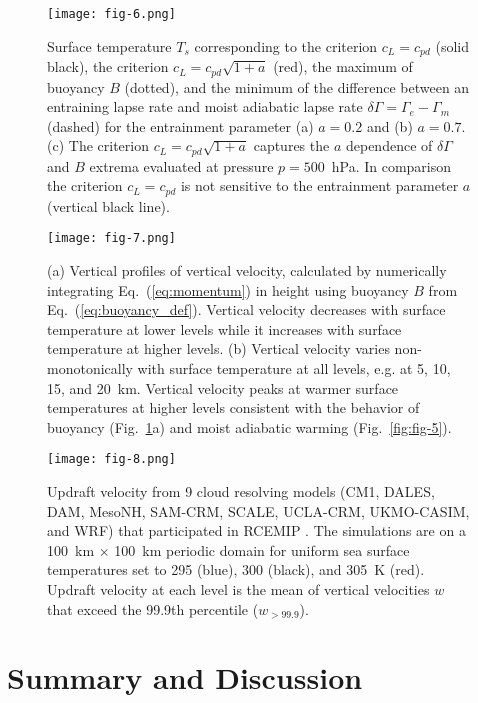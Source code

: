 \documentclass[draft]{ametsocV6.1}
\begin{document}
\begin{figure}[htbp]
 \centering
 \texttt{[image: fig-6.png]}\\
 \caption{Surface temperature $T_s$ corresponding to the criterion $c_L=c_{pd}$ (solid black), the criterion $c_L=c_{pd}\sqrt{1+a}$ (red), the maximum of buoyancy $B$ (dotted), and the minimum of the difference between an entraining lapse rate and moist adiabatic lapse rate $\delta \Gamma = \Gamma_e - \Gamma_m$ (dashed) for the entrainment parameter (a) $a=0.2$ and (b) $a=0.7$. (c) The criterion $c_L=c_{pd}\sqrt{1+a}$ captures the $a$ dependence of $\delta \Gamma$ and $B$ extrema evaluated at pressure $p=500$~hPa. In comparison the criterion $c_L=c_{pd}$ is not sensitive to the entrainment parameter $a$ (vertical black line).}\label{fig:fig-6}
\end{figure}

\begin{figure}[htbp]
 \centering
 \texttt{[image: fig-7.png]}\\
 \caption{(a) Vertical profiles of vertical velocity, calculated by numerically integrating Eq.~(\ref{eq:momentum}) in height using buoyancy $B$ from Eq.~(\ref{eq:buoyancy_def}). Vertical velocity decreases with surface temperature at lower levels while it increases with surface temperature at higher levels. (b) Vertical velocity varies non-monotonically with surface temperature at all levels, e.g. at 5, 10, 15, and 20~km. Vertical velocity peaks at warmer surface temperatures at higher levels consistent with the behavior of buoyancy (Fig.~\ref{fig:fig-6}a) and moist adiabatic warming (Fig.~\ref{fig:fig-5}).}\label{fig:fig-7}
\end{figure}

\clearpage

\begin{figure}[htbp]
 \centering
 \texttt{[image: fig-8.png]}\\
 \caption{Updraft velocity from 9 cloud resolving models (CM1, DALES, DAM, MesoNH, SAM-CRM, SCALE, UCLA-CRM, UKMO-CASIM, and WRF) that participated in RCEMIP \citep{wing2018}. The simulations are on a 100~km $\times$ 100~km periodic domain for uniform sea surface temperatures set to 295 (blue), 300 (black), and 305~K (red). Updraft velocity at each level is the mean of vertical velocities $w$ that exceed the 99.9th percentile ($w_{>99.9}$).}\label{fig:fig-8}
\end{figure}


\section{Summary and Discussion}
\end{document}
